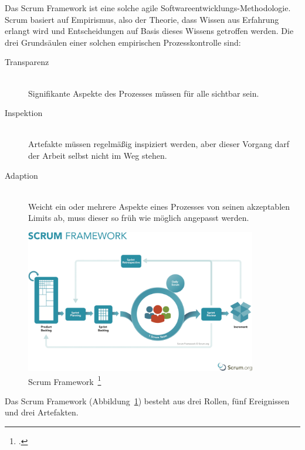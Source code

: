 Das Scrum Framework ist eine solche agile Softwareentwicklungs-Methodologie. 
Scrum basiert auf Empirismus, also der Theorie, dass Wissen aus Erfahrung erlangt wird und Entscheidungen auf Basis dieses Wissens getroffen werden. 
Die drei Grundsäulen einer solchen empirischen Prozesskontrolle sind:

\begin{description}
  \item[Transparenz] \hfill \\ Signifikante Aspekte des Prozesses müssen für alle sichtbar sein.
  \item[Inspektion] \hfill \\ Artefakte müssen regelmäßig inspiziert werden, aber dieser Vorgang darf der Arbeit selbst nicht im Weg stehen.
  \item[Adaption] \hfill \\ Weicht ein oder mehrere Aspekte eines Prozesses von seinen akzeptablen Limits ab, muss dieser so früh wie möglich angepasst werden.
\end{description}

\begin{savenotes}
  \begin{figure}[H] 
    \centering
    \includegraphics[width=0.9\textwidth]{img/scrum-framework.png}
    \caption[Scrum Framework]{Scrum Framework~\footcite{scrum_framework}}\label{fig:scrum_framework}
  \end{figure}
\end{savenotes}

Das Scrum Framework (Abbildung~\ref{fig:scrum_framework}) besteht aus drei Rollen, fünf Ereignissen und drei Artefakten.

